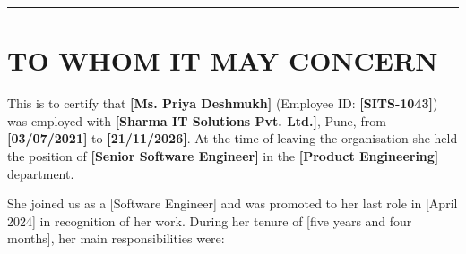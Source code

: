 \documentclass[10pt]{article}
\begin{document}
\fontsize{10.5}{13.2}\selectfont
{\setlength{\fboxrule}{0.4pt}\renewcommand{\arraystretch}{1.1}}\par{\color{accent}\rule{\linewidth}{1.8pt}}\par\vspace{8pt}

\section{TO WHOM IT MAY CONCERN}

This is to certify that \textbf{[Ms. Priya Deshmukh]} (Employee ID: \textbf{[SITS-1043]}) was employed with \textbf{[Sharma IT Solutions Pvt. Ltd.]}, Pune, from \textbf{[03/07/2021]} to \textbf{[21/11/2026]}. At the time of leaving the organisation she held the position of \textbf{[Senior Software Engineer]} in the \textbf{[Product Engineering]} department.\par\vspace{4pt}

She joined us as a [Software Engineer] and was promoted to her last role in [April 2024] in recognition of her work. During her tenure of [five years and four months], her main responsibilities were:\par\vspace{4pt}
\end{document}
